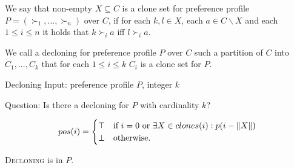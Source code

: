 \begin{defn}
We say that non-empty $X \subseteq C$ is a clone set for preference profile $P = (\succ_1, ... , \succ_n)$ over $C$,
if for each $k,l \in X$, each $a \in C \backslash X$ and each $1 \leq i \leq n $ it holds that
$k \succ_i a$ iff $l \succ_i a$.
\end{defn}

\begin{defn}
We call a decloning for preference profile $P$ over $C$
such a partition of $C$  into $C_1, ... , C_k$
that for each $1 \leq i \leq k$ $C_i$ is a clone set for $P$.
\end{defn}




\begin{problem}{Decloning}
    Input: preference profile $P$, integer $k$

    Question: Is there a decloning for $P$ with cardinality $k$?
\end{problem}

$$
pos(i) =
    \begin{cases}
        \top & \text{if $i=0$ or } \exists X \in clones(i): p(i - \left\|X\right\|) \\
        \bot & \text{otherwise.}
    \end{cases}
$$

\begin{thm}
\textsc{Decloning} is in $P$.
\end{thm}